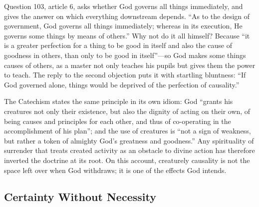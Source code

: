 Question 103, article 6, asks whether God governs all things immediately, and gives the answer on which everything downstream depends. ``As to the design of government, God governs all things immediately; whereas in its execution, He governs some things by means of others.'' Why not do it all himself? Because ``it is a greater perfection for a thing to be good in itself and also the cause of goodness in others, than only to be good in itself''---so God makes some things causes of others, as a master not only teaches his pupils but gives them the power to teach. The reply to the second objection puts it with startling bluntness: ``If God governed alone, things would be deprived of the perfection of causality.''

The Catechism states the same principle in its own idiom: God ``grants his creatures not only their existence, but also the dignity of acting on their own, of being causes and principles for each other, and thus of co-operating in the accomplishment of his plan''; and the use of creatures is ``not a sign of weakness, but rather a token of almighty God's greatness and goodness.'' Any spirituality of surrender that treats created activity as an obstacle to divine action has therefore inverted the doctrine at its root. On this account, creaturely causality is not the space left over when God withdraws; it is one of the effects God intends.

\subsection{Certainty Without Necessity}


